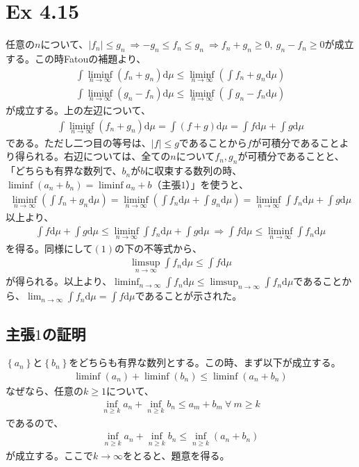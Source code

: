 \documentclass{article}
\begin{document}
\section{Ex 4.15}
任意の$n$について、$\left| f_n \right| \leq g_n\ \Rightarrow -g_n \leq f_n \leq g_n\ \Rightarrow f_n + g_n \geq 0,\ g_n -f_n \geq 0$が成立する。この時Fatouの補題より、
\begin{align}
	\int \liminf_{n\to \infty} (f_n + g_n) \mathrm{d}\mu \leq \liminf_{n\to \infty}\left( \int f_n + g_n \mathrm{d}\mu\right)\\
	\int \liminf_{n\to \infty} (g_n - f_n) \mathrm{d}\mu \leq \liminf_{n\to \infty}\left(  \int g_n - f_n \mathrm{d}\mu\right)
\end{align}
が成立する。上の左辺について、
\begin{align*}
	\int \liminf_{n\to \infty}( f_n + g_n) \mathrm{d}\mu = \int (f + g) \mathrm{d}\mu = \int f \mathrm{d}\mu + \int g \mathrm{d}\mu
\end{align*}
である。ただし二つ目の等号は、$|f| \leq g$であることから$f$が可積分であることより得られる。右辺については、全ての$n$について$f_n, g_n$が可積分であることと、「どちらも有界な数列で、$b_n$が$b$に収束する数列の時、$\liminf (a_n + b_n) = \liminf a_n + b$（主張$1$）」を使うと、
\begin{align*}
	\liminf_{n\to \infty} \left(  \int f_n + g_n \mathrm{d}\mu\right) = \liminf_{n \to \infty} \left( \int f_n \mathrm{d}\mu + \int g_n \mathrm{d}\mu \right) = \liminf_{n \to \infty} \int f_n \mathrm{d}\mu + \int g \mathrm{d}\mu
\end{align*}
以上より、
\begin{align*}
	\int f \mathrm{d}\mu + \int g \mathrm{d}\mu \leq  \liminf_{n \to \infty} \int f_n \mathrm{d}\mu + \int g \mathrm{d}\mu\ \Rightarrow \int f \mathrm{d}\mu \leq \liminf_{n \to \infty} \int f_n \mathrm{d}\mu
\end{align*}
を得る。同様にして$(1)$の下の不等式から、
\begin{align*}
	\limsup_{n \to \infty} \int f_n \mathrm{d}\mu \leq \int f \mathrm{d}\mu
\end{align*}
が得られる。以上より、$\liminf_{n \to \infty} \int f_n \mathrm{d}\mu \leq \limsup_{n \to \infty} \int f_n \mathrm{d}\mu$であることから、$\lim_{n \to \infty} \int f_n \mathrm{d}\mu = \int f \mathrm{d}\mu$であることが示された。

\subsection{主張$1$の証明}
$\left\{ a_n \right\}$と$\left\{ b_n \right\}$をどちらも有界な数列とする。この時、まず以下が成立する。
\begin{align*}
	\liminf(a_n) + \liminf(b_n) \leq \liminf(a_n + b_n)
\end{align*}
なぜなら、任意の$k \geq 1$について、
\begin{align*}
	\inf_{n \geq k} a_n + \inf_{n \geq k} b_n \leq a_m + b_m\ \forall\ m \geq k
\end{align*}
であるので、
\begin{align*}
	\inf_{n \geq k} a_n + \inf_{n \geq k} b_n \leq \inf_{n \geq k} (a_n + b_n)
\end{align*}
が成立する。ここで$k \to \infty$をとると、題意を得る。
\end{document}
